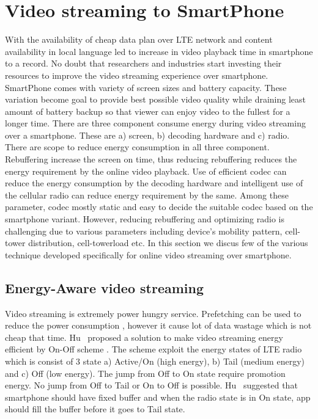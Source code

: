 \section{Video streaming to SmartPhone}
With the availability of cheap data plan over LTE network and content availability in local language led to increase in video playback time in smartphone to a record. No doubt that researchers and industries start investing their resources to improve the video streaming experience over smartphone. SmartPhone comes with variety of screen sizes and battery capacity. These variation become goal to provide best possible video quality while draining least amount of battery backup so that viewer can enjoy video to the fullest for a longer time. There are three component consume energy during video streaming over a smartphone. These are a) screen, b) decoding hardware and c) radio. There are scope to reduce energy consumption in all three component. Rebuffering increase the screen on time, thus reducing rebuffering reduces the energy requirement by the online video playback. Use of efficient codec can reduce the energy consumption by the decoding hardware and intelligent use of the cellular radio can reduce energy requirement by the same. Among these parameter, codec  mostly static and easy to decide the suitable codec based on the smartphone variant. However, reducing rebuffering and optimizing radio is challenging due to various parameters including device's mobility pattern, cell-tower distribution, cell-towerload etc. In this section we discus few of the various technique developed specifically for online video streaming over smartphone.

\subsection{Energy-Aware video streaming}
Video streaming is extremely power hungry service. Prefetching can be used to reduce the power consumption \cite{6681586,10.1145/2079296.2079321}, however it cause lot of data wastage which is not cheap that time. Hu \etal\ proposed a solution to make video streaming energy efficient by On-Off scheme \cite{7218493}. The scheme exploit the energy states of LTE radio which is consist of 3 state a) Active/On (high energy), b) Tail (medium energy) and c) Off (low energy). The jump from Off to On state require promotion energy. No jump from Off to Tail or On to Off is possible. Hu \etal\ suggested that smartphone should have fixed buffer and when the radio state is in On state, app should fill the buffer before it goes to Tail state.

